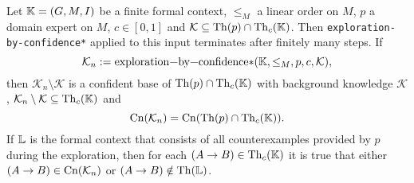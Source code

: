 \begin{Corollary}
  \label{cor:exploration-by-confidence-weaker-version-properties}
  Let ${\mathbb{K}} = (G, M, I)$ be a finite formal context, $\leq_{M}$ a linear order on $M$,
  $p$ a domain expert on $M$, $c \in [0,1]$ and $\mathcal{K} \subseteq \operatorname{Th}(p) \cap
  \operatorname{Th}_{c}({\mathbb{K}})$.  Then \lstinline{exploration-by-confidence*} applied to this input
  terminates after finitely many steps.  If
  \begin{equation*}
    \mathcal{K}_{n} := \text{\lstinline{exploration-by-confidence*}}(\con K, \leq_{M}, p,
    c, \mathcal{K}),
  \end{equation*}
  then $\mathcal{K}_{n} \setminus \mathcal{K}$ is a confident base of $\operatorname{Th}(p) \cap
  \operatorname{Th}_{c}({\mathbb{K}})$ with background knowledge $\mathcal{K}$, \ie $\mathcal{K}_{n} \setminus
  \mathcal{K} \subseteq \operatorname{Th}_{c}({\mathbb{K}})$ and
  \begin{equation*}
    \operatorname{Cn}(\mathcal{K}_{n}) = \operatorname{Cn}(\operatorname{Th}(p) \cap \operatorname{Th}_{c}({\mathbb{K}})).
  \end{equation*}
  If ${\mathbb{L}}$ is the formal context that consists of all counterexamples provided by $p$
  during the exploration, then for each $(A \to B) \in \operatorname{Th}_{c}({\mathbb{K}})$ it is true that
  either $(A \to B) \in \operatorname{Cn}(\mathcal{K}_{n})$ or $(A \to B) \notin \operatorname{Th}({\mathbb{L}})$.
\end{Corollary}


